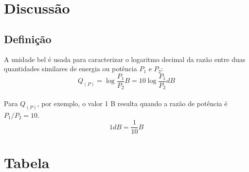 \section{Discussão}

\subsection{Definição}
A unidade bel é usada para caracterizar o logaritmo decimal da razão entre duas quantidades similares de energia ou potência $P_1$ e $P_2$:\\
    $$Q_(P) = \log\frac{P_1}{P_2} B = 10 \log\frac{P_1}{P_2} dB$$\\
Para $Q_{(P)}$, por exemplo, o valor 1 B resulta quando a razão de potência é $P_1/P_2 = 10$.
$$1dB = \frac{1}{10} B$$

\section{Tabela}
